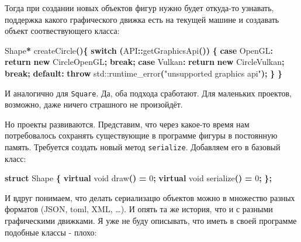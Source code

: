 \documentclass[14pt,a4paper]{article}
\newenvironment{Shaded}{\begin{paragraph}}{\end{paragraph}}
\newenvironment{Highlighting}{\begin{paragraph}}{\end{paragraph}}
\newcommand{\KeywordTok}[1]{\textcolor[rgb]{0.13,0.29,0.53}{\textbf{#1}}}
\newcommand{\DataTypeTok}[1]{\textcolor[rgb]{0.13,0.29,0.53}{#1}}
\newcommand{\DecValTok}[1]{\textcolor[rgb]{0.00,0.00,0.81}{#1}}
\newcommand{\StringTok}[1]{\textcolor[rgb]{0.31,0.60,0.02}{#1}}
\newcommand{\ControlFlowTok}[1]{\textcolor[rgb]{0.13,0.29,0.53}{\textbf{#1}}}
\newcommand{\OperatorTok}[1]{\textcolor[rgb]{0.81,0.36,0.00}{\textbf{#1}}}
\newcommand{\BuiltInTok}[1]{#1}
\newcommand{\NormalTok}[1]{#1}
\begin{document}
Тогда при создании новых объектов фигур нужно будет откуда-то узнавать,
поддержка какого графического движка есть на текущей машине и создавать
объект соотвествующего класса:

\begin{Shaded}
\begin{Highlighting}[]
\NormalTok{Shape}\OperatorTok{*}\NormalTok{ createCircle}\OperatorTok{()\{}
    \ControlFlowTok{switch} \OperatorTok{(}\NormalTok{API}\OperatorTok{::}\NormalTok{getGraphicsApi}\OperatorTok{())} \OperatorTok{\{}
        \ControlFlowTok{case}\NormalTok{ OpenGL}\OperatorTok{:}
            \ControlFlowTok{return} \KeywordTok{new}\NormalTok{ CircleOpenGL}\OperatorTok{;}
            \ControlFlowTok{break}\OperatorTok{;}
        \ControlFlowTok{case}\NormalTok{ Vulkan}\OperatorTok{:}
            \ControlFlowTok{return} \KeywordTok{new}\NormalTok{ CircleVulkan}\OperatorTok{;}
            \ControlFlowTok{break}\OperatorTok{;}
        \ControlFlowTok{default}\OperatorTok{:}
            \ControlFlowTok{throw} \BuiltInTok{std::}\NormalTok{runtime\_error}\OperatorTok{(}\StringTok{"unsupported graphics api"}\OperatorTok{);}
    \OperatorTok{\}}
\OperatorTok{\}}
\end{Highlighting}
\end{Shaded}

И аналогично для \texttt{Square}. Да, оба подхода сработают. Для
маленьких проектов, возможно, даже ничего страшного не произойдёт.

Но проекты развиваются. Представим, что через какое-то время нам
потребовалось сохранять существующие в программе фигуры в постоянную
память. Требуется создать новый метод \texttt{serialize}. Добавляем его
в базовый класс:

\begin{Shaded}
\begin{Highlighting}[]
\KeywordTok{struct}\NormalTok{ Shape }\OperatorTok{\{}
    \KeywordTok{virtual} \DataTypeTok{void}\NormalTok{ draw}\OperatorTok{()} \OperatorTok{=} \DecValTok{0}\OperatorTok{;}
    \KeywordTok{virtual} \DataTypeTok{void}\NormalTok{ serialize}\OperatorTok{()} \OperatorTok{=} \DecValTok{0}\OperatorTok{;}
\OperatorTok{\};}
\end{Highlighting}
\end{Shaded}

И вдруг понимаем, что делать сериализацю объектов можно в множество
разных форматов (JSON, toml, XML, \ldots). И опять та же история, что и
с разными графическими движками. Я уже не буду описывать, что иметь в
своей программе подобные классы - плохо:
\end{document}
